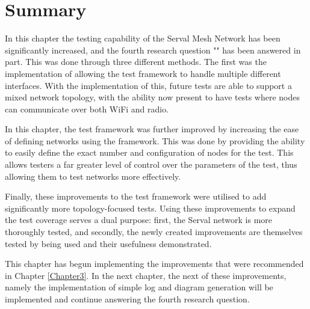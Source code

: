 \section{Summary}
In this chapter the testing capability of the Serval Mesh Network has been significantly increased, and the fourth research question "\fourthRQ" has been answered in part.
This was done through three different methods.
The first was the implementation of allowing the test framework to handle multiple different interfaces.
With the implementation of this, future tests are able to support a mixed network topology, with the ability now present to have tests where nodes can communicate over both WiFi and radio. 

In this chapter, the test framework was further improved by increasing the ease of defining networks using the framework.
This was done by providing the ability to easily define the exact number and configuration of nodes for the test.
This allows testers a far greater level of control over the parameters of the test, thus allowing them to test networks more effectively.

Finally, these improvements to the test framework were utilised to add significantly more topology-focused tests.
Using these improvements to expand the test coverage serves a dual purpose: first, the Serval network is more thoroughly tested, and secondly, the newly created improvements are themselves tested by being used and their usefulness demonstrated.

This chapter has begun implementing the improvements that were recommended in Chapter \ref{Chapter3}.
In the next chapter, the next of these improvements, namely the implementation of simple log and diagram generation will be implemented and continue answering the fourth research question.
